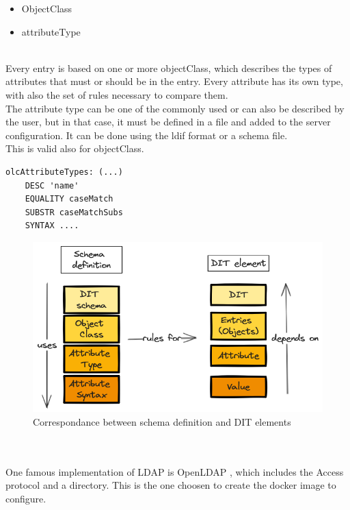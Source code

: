\begin{itemize}
    \item ObjectClass 
    \item attributeType 
\end{itemize}
\\
Every entry is based on one or more objectClass, which describes the types of attributes that must or should be in the entry.  Every attribute has its own type, with also the set of rules necessary to compare them. 
\\
The attribute type can be one of the commonly used or can also be described by the user, but in that case, it must be defined in a file and added to the server configuration. It can be done using the ldif format or a schema file.
\\
This is valid also for objectClass.
\begin{mdframed}[backgroundcolor=back1]
    \begin{lstlisting}[style=bash, caption={Example of definition of an attributeType (for objectClasses is similar)}]
olcAttributeTypes: (...)
    DESC 'name'
    EQUALITY caseMatch
    SUBSTR caseMatchSubs
    SYNTAX ....
    \end{lstlisting}
\end{mdframed}
\begin{figure}[h]
    \caption{Correspondance between schema definition and DIT elements}
    \centering
    \includegraphics[width=15cm]{img/dit.png}
\end{figure}
\\\\
One famous implementation of LDAP is OpenLDAP \cite{openldap}, which includes the Access protocol and a directory. This is the one choosen to create the docker image to configure.
